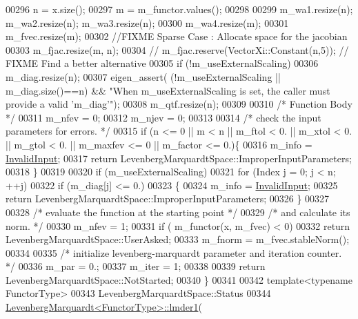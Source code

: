 \begin{DoxyCode}
00296     n = x.size();
00297     m = m\_functor.values();
00298 
00299     m\_wa1.resize(n); m\_wa2.resize(n); m\_wa3.resize(n);
00300     m\_wa4.resize(m);
00301     m\_fvec.resize(m);
00302     \textcolor{comment}{//FIXME Sparse Case : Allocate space for the jacobian}
00303     m\_fjac.resize(m, n);
00304 \textcolor{comment}{//     m\_fjac.reserve(VectorXi::Constant(n,5)); // FIXME Find a better alternative}
00305     \textcolor{keywordflow}{if} (!m\_useExternalScaling)
00306         m\_diag.resize(n);
00307     eigen\_assert( (!m\_useExternalScaling || m\_diag.size()==n) && \textcolor{stringliteral}{"When m\_useExternalScaling is set, the
       caller must provide a valid 'm\_diag'"});
00308     m\_qtf.resize(n);
00309 
00310     \textcolor{comment}{/* Function Body */}
00311     m\_nfev = 0;
00312     m\_njev = 0;
00313 
00314     \textcolor{comment}{/*     check the input parameters for errors. */}
00315     \textcolor{keywordflow}{if} (n <= 0 || m < n || m\_ftol < 0. || m\_xtol < 0. || m\_gtol < 0. || m\_maxfev <= 0 || m\_factor <= 0.)\{
00316       m\_info = \hyperlink{group__enums_gga85fad7b87587764e5cf6b513a9e0ee5ea945604f62795ffc70aedf2bd12ea0434}{InvalidInput};
00317       \textcolor{keywordflow}{return} LevenbergMarquardtSpace::ImproperInputParameters;
00318     \}
00319 
00320     \textcolor{keywordflow}{if} (m\_useExternalScaling)
00321         \textcolor{keywordflow}{for} (Index j = 0; j < n; ++j)
00322             \textcolor{keywordflow}{if} (m\_diag[j] <= 0.) 
00323             \{
00324               m\_info = \hyperlink{group__enums_gga85fad7b87587764e5cf6b513a9e0ee5ea945604f62795ffc70aedf2bd12ea0434}{InvalidInput};
00325               \textcolor{keywordflow}{return} LevenbergMarquardtSpace::ImproperInputParameters;
00326             \}
00327 
00328     \textcolor{comment}{/*     evaluate the function at the starting point */}
00329     \textcolor{comment}{/*     and calculate its norm. */}
00330     m\_nfev = 1;
00331     \textcolor{keywordflow}{if} ( m\_functor(x, m\_fvec) < 0)
00332         \textcolor{keywordflow}{return} LevenbergMarquardtSpace::UserAsked;
00333     m\_fnorm = m\_fvec.stableNorm();
00334 
00335     \textcolor{comment}{/*     initialize levenberg-marquardt parameter and iteration counter. */}
00336     m\_par = 0.;
00337     m\_iter = 1;
00338 
00339     \textcolor{keywordflow}{return} LevenbergMarquardtSpace::NotStarted;
00340 \}
00341 
00342 \textcolor{keyword}{template}<\textcolor{keyword}{typename} FunctorType>
00343 LevenbergMarquardtSpace::Status
00344 \hyperlink{class_eigen_1_1_levenberg_marquardt}{LevenbergMarquardt<FunctorType>::lmder1}(

\end{DoxyCode}
